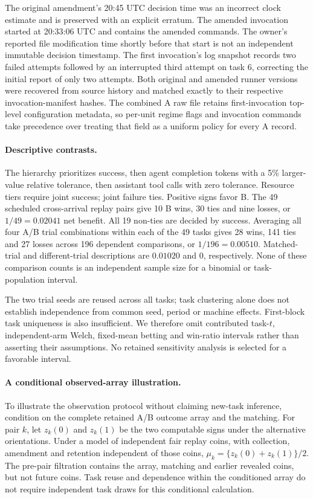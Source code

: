 The original amendment's 20:45 UTC decision time was an incorrect clock
estimate and is preserved with an explicit erratum. The amended invocation
started at 20:33:06 UTC and contains the amended commands. The owner's
reported file modification time shortly before that start is not an
independent immutable decision timestamp. The first invocation's log
snapshot records two failed attempts followed by an interrupted third
attempt on task 6, correcting the initial report of only two attempts.
Both original and amended runner versions were recovered from source
history and matched exactly to their respective invocation-manifest hashes.
The combined A raw file retains first-invocation top-level configuration
metadata, so per-unit regime flags and invocation commands take precedence
over treating that field as a uniform policy for every A record.

\paragraph{Descriptive contrasts.}
The hierarchy prioritizes success, then agent completion tokens with a
5\% larger-value relative tolerance, then assistant tool calls with zero
tolerance. Resource tiers require joint success; joint failure ties.
Positive signs favor B. The 49 scheduled cross-arrival replay pairs give
10 B wins, 30 ties and nine losses, or $1/49=0.02041$ net benefit.
All 19 non-ties are decided by success. Averaging all four A/B trial
combinations within each of the 49 tasks gives 28 wins, 141 ties and
27 losses across 196 dependent comparisons, or $1/196=0.00510$.
Matched-trial and different-trial descriptions are $0.01020$ and $0$,
respectively. None of these comparison counts is an independent sample
size for a binomial or task-population interval.

The two trial seeds are reused across all tasks; task clustering alone
does not establish independence from common seed, period or machine
effects. First-block task uniqueness is also insufficient. We therefore
omit contributed task-$t$, independent-arm Welch, fixed-mean betting
and win-ratio intervals rather than asserting their assumptions.
No retained sensitivity analysis is selected for a favorable interval.

\paragraph{A conditional observed-array illustration.}
To illustrate the observation protocol without claiming new-task inference,
condition on the complete retained A/B outcome array and the matching.
For pair $k$, let $z_k(0)$ and $z_k(1)$ be the two computable signs under
the alternative orientations. Under a model of independent fair replay
coins, with collection, amendment and retention independent of those
coins, $\mu_k=\{z_k(0)+z_k(1)\}/2$. The pre-pair filtration contains
the array, matching and earlier revealed coins, but not future coins.
Task reuse and dependence within the conditioned array do not require
independent task draws for this conditional calculation.

